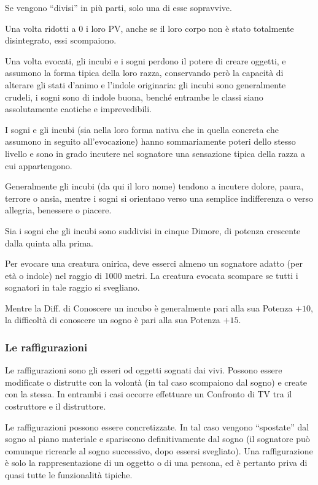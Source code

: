 Se vengono ``divisi'' in pi\`u parti, solo una di esse sopravvive.

Una volta ridotti a 0 i loro PV, anche se il loro corpo non \`e
stato totalmente disintegrato, essi scompaiono.

Una volta evocati, gli incubi e i sogni perdono il potere di creare
oggetti, e assumono la forma tipica della loro razza, conservando
per\`o la capacit\`a di alterare gli stati d'animo e l'indole
originaria: gli incubi sono generalmente crudeli, i sogni sono di
indole buona, bench\'e entrambe le classi siano assolutamente
caotiche e imprevedibili. 

I sogni e gli incubi (sia nella loro forma nativa che in quella
concreta che assumono in seguito all'evocazione) hanno sommariamente
poteri dello stesso livello e sono in grado incutere nel sognatore una
sensazione tipica della razza a cui appartengono.

Generalmente gli incubi (da qui il loro nome) tendono a incutere
dolore, paura, terrore o ansia, mentre i sogni si orientano verso una
semplice indifferenza o verso allegria, benessere o piacere.

Sia i sogni che gli incubi sono suddivisi in cinque Dimore, di potenza
crescente dalla quinta alla prima.  

Per evocare una creatura onirica, deve esserci almeno un sognatore
adatto (per et\`a o indole) nel raggio di 1000 metri. La creatura
evocata scompare se tutti i sognatori in tale raggio si svegliano.

Mentre la Diff. di Conoscere un incubo \`e generalmente pari alla sua
Potenza $+10$, la difficolt\`a di conoscere un sogno \`e pari alla sua
Potenza $+15$.

\subsubsection{Le raffigurazioni} 

Le raffigurazioni sono gli esseri od oggetti sognati dai vivi. Possono
essere modificate o distrutte con la volont\`a (in tal caso
scompaiono dal sogno) e create con la stessa.  In entrambi i casi
occorre effettuare un Confronto di TV tra il costruttore e il
distruttore.

Le raffigurazioni possono essere concretizzate. In tal caso vengono
``spostate'' dal sogno al piano materiale e spariscono definitivamente
dal sogno (il sognatore pu\`o comunque ricrearle al sogno
successivo, dopo essersi svegliato). Una raffigurazione \`e solo la
rappresentazione di un oggetto o di una persona, ed \`e pertanto
priva di quasi tutte le funzionalit\`a tipiche.

